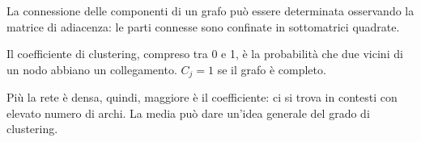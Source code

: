 La connessione delle componenti di un grafo può essere determinata osservando la matrice di adiacenza: le parti connesse sono confinate in sottomatrici quadrate.

Il coefficiente di clustering, compreso tra 0 e 1, è la probabilità che due vicini di un nodo abbiano un collegamento. $C_j = 1$ se il grafo è completo. 

Più la rete è densa, quindi, maggiore è il coefficiente: ci si trova in contesti con elevato numero di archi. La media può dare un'idea generale del grado di clustering.


